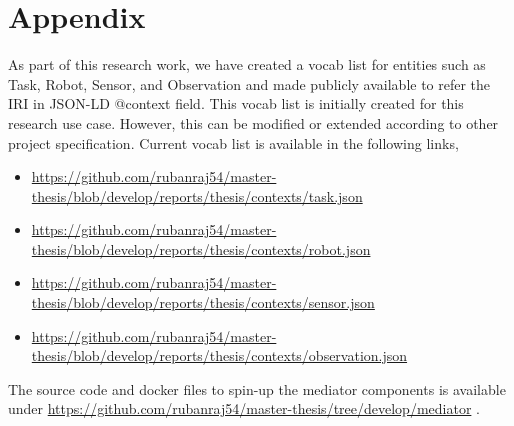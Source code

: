 

\let\cleardoublepage\clearpage
    \chapter{Appendix} \label{appendix}

	As part of this research work, we have created a vocab list for entities such as Task, Robot, Sensor, and Observation and made publicly available to refer the IRI in JSON-LD @context field. This vocab list is initially created for this research use case. However, this can be modified or extended according to other project specification. Current vocab list is available in the following links,
	
	\begin{itemize}
		\item \url{https://github.com/rubanraj54/master-thesis/blob/develop/reports/thesis/contexts/task.json}
		\item \url{https://github.com/rubanraj54/master-thesis/blob/develop/reports/thesis/contexts/robot.json}
		\item \url{https://github.com/rubanraj54/master-thesis/blob/develop/reports/thesis/contexts/sensor.json}
		\item \url{https://github.com/rubanraj54/master-thesis/blob/develop/reports/thesis/contexts/observation.json}
								
	\end{itemize}

	The source code and docker files to spin-up the mediator components is available under \url{https://github.com/rubanraj54/master-thesis/tree/develop/mediator} .

%